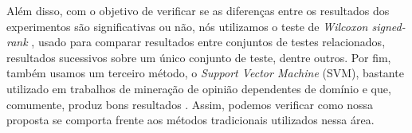 
Além disso, com o objetivo de verificar se as diferenças entre os resultados dos experimentos são significativas ou não, nós utilizamos o teste de \textit{Wilcoxon signed-rank} \cite{wilcoxon1945individual}, usado para comparar resultados entre conjuntos de testes relacionados, resultados sucessivos sobre um único conjunto de teste, dentre outros. Por fim, também usamos um terceiro método, o \textit{Support Vector Machine} (SVM), bastante utilizado em trabalhos de mineração de opinião dependentes de domínio e que, comumente, produz bons resultados \cite{ohana2009sentiment, moraes2012document}. Assim, podemos verificar como nossa proposta se comporta frente aos métodos tradicionais utilizados nessa área. 

